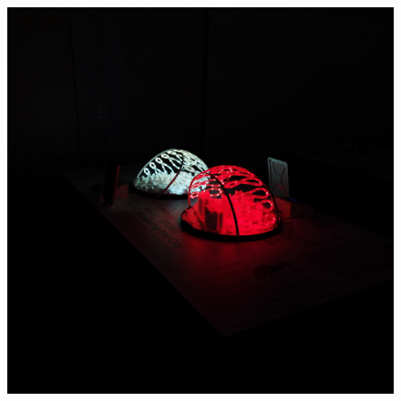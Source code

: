\documentclass[a4paper,9pt]{article}
\begin{document}
\begin{center}
\begin{minipage}{0.48\linewidth}
         \begin{figure}[H]
        \centering
        \includegraphics[width=\linewidth]{Images/dr.jpg}
    \end{figure}
\end{minipage}
\end{center}
\end{document}
